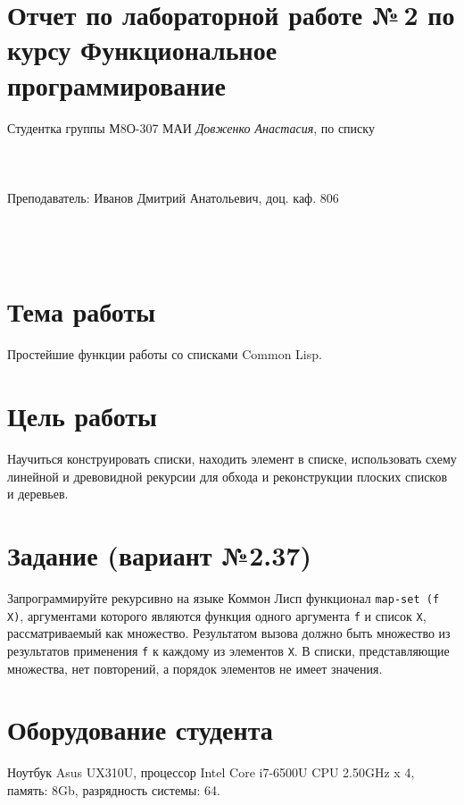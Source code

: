 \documentclass[12pt]{article}
\begin{document}
\section*{Отчет по лабораторной работе №\,2
по курсу \guillemotleft  Функциональное программирование\guillemotright}
\begin{flushright}
Студентка группы М8О-307 МАИ \textit{Довженко Анастасия},  по списку \\
 \\
 \\
\ \\
Преподаватель: Иванов Дмитрий Анатольевич, доц. каф. 806 \\
 \\
 \\
 \\

\end{flushright}

\section{Тема работы}
Простейшие функции работы со списками Common Lisp.

\section{Цель работы}
Научиться конструировать списки, находить элемент в списке, использовать схему линейной и древовидной рекурсии для обхода и реконструкции плоских списков и деревьев.

\section{Задание (вариант №2.37)}
Запрограммируйте рекурсивно на языке Коммон Лисп функционал {\tt map-set (f X)}, аргументами которого являются функция одного аргумента {\tt f} и список {\tt X}, рассматриваемый как множество. Результатом вызова должно быть множество из результатов применения {\tt f} к каждому из элементов {\tt X}. В списки, представляющие множества, нет повторений, а порядок элементов не имеет значения.

\section{Оборудование студента}
Ноутбук Asus UX310U, процессор Intel Core i7-6500U CPU 2.50GHz x 4, память: 8Gb, разрядность системы: 64.
\end{document}
